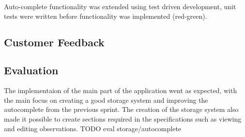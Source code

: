Auto-complete functionality was extended using test driven development, unit
tests were written before functionality was implemented (red-green).

\subsection{Customer Feedback}

\subsection{Evaluation}
The implementaion of the main part of the application went as expected, with the main focus on creating a good storage system and improving the autocomplete from the previous sprint. The creation of the storage system also made it possible to create sections required in the specifications such as viewing and editing observations.
TODO eval storage/autocomplete
